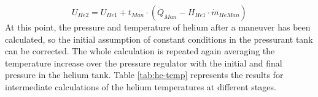\begin{equation}
    U_{He2} = U_{He1}+t_{Man}\cdot (\dot{Q}_{Man}-H_{He1}\cdot \dot{m}_{HeMan})
\label{eq:IntEnHe}
\end{equation}
At this point, the pressure and temperature of helium after a maneuver has been calculated, so the initial assumption of constant conditions in the pressurant tank can be corrected. The whole calculation is repeated again averaging the temperature increase over the pressure regulator with the initial and final pressure in the helium tank. Table \ref{tab:he-temp} represents the results for intermediate calculations of the helium temperatures at different stages. 
\begin{table}[H]
\centering
\caption{Helium Temperature}
\label{tab:he-temp}
\end{table}
